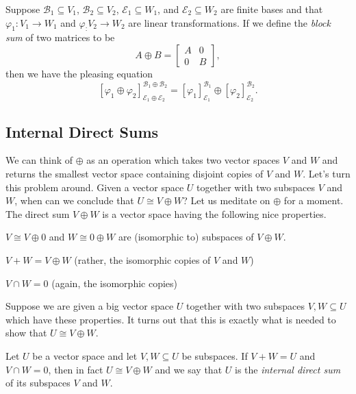 \documentclass{memoir}
\begin{document}
\begin{prp}
Suppose $\mathcal{B}_1 \subseteq V_1$, $\mathcal{B}_2 \subseteq V_2$, $\mathcal{E}_1 \subseteq W_1$, and $\mathcal{E}_2 \subseteq W_2$ are finite bases and that $\varphi_1 : V_1 \rightarrow W_1$ and $\varphi_ : V_2 \rightarrow W_2$ are linear transformations. If we define the \emph{block sum} of two matrices to be \[ A \oplus B = \left[ \begin{array}{c|c} A & 0 \\ \hline 0 & B \end{array} \right], \] then we have the pleasing equation \[ [\varphi_1 \oplus \varphi_2]^{\mathcal{B}_1 \oplus \mathcal{B}_2}_{\mathcal{E}_1 \oplus \mathcal{E}_2} = [\varphi_1]^{\mathcal{B}_1}_{\mathcal{E}_1} \oplus [\varphi_2]^{\mathcal{B}_2}_{\mathcal{E}_2}. \]
\end{prp}

\subsection*{Internal Direct Sums}

We can think of $\oplus$ as an operation which takes two vector spaces $V$ and $W$ and returns the smallest vector space containing disjoint copies of $V$ and $W$. Let's turn this problem around. Given a vector space $U$ together with two subspaces $V$ and $W$, when can we conclude that $U \cong V \oplus W$? Let us meditate on $\oplus$ for a moment. The direct sum $V \oplus W$ is a vector space having the following nice properties.
\begin{enumerate*}
\item $V \cong V \oplus 0$ and $W \cong 0 \oplus W$ are (isomorphic to) subspaces of $V \oplus W$.
\item $V + W = V \oplus W$ (rather, the isomorphic copies of $V$ and $W$)
\item $V \cap W = 0$ (again, the isomorphic copies)
\end{enumerate*}
Suppose we are given a big vector space $U$ together with two subspaces $V,W \subseteq U$ which have these properties. It turns out that this is exactly what is needed to show that $U \cong V \oplus W$.

\begin{prp}
Let $U$ be a vector space and let $V,W \subseteq U$ be subspaces. If $V + W = U$ and $V \cap W = 0$, then in fact $U \cong V \oplus W$ and we say that $U$ is the \emph{internal direct sum} of its subspaces $V$ and $W$.
\end{prp}
\end{document}
